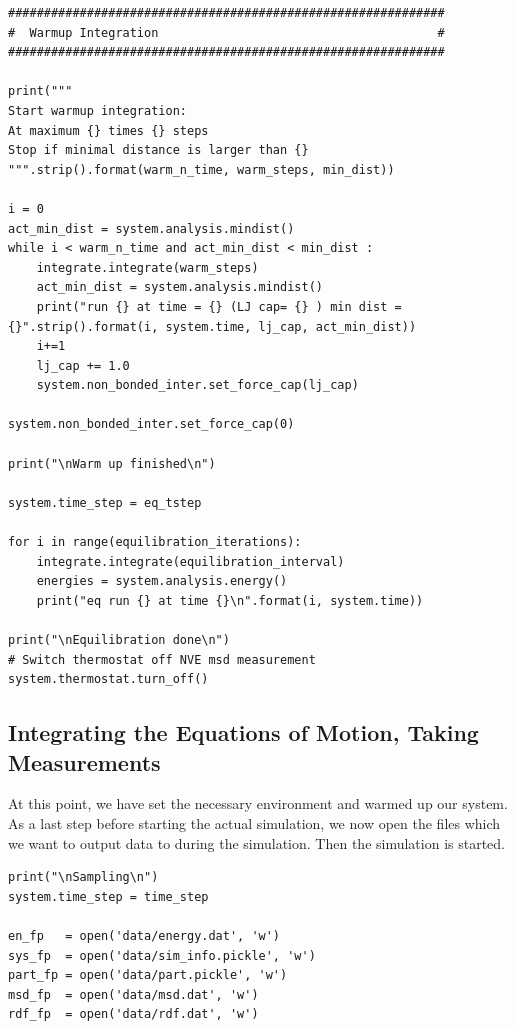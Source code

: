 \documentclass[
paper=a4,                       %
fontsize=11pt,                  %
twoside,                        %
footsepline,                    %
headsepline,                    %
headinclude=false,              %
footinclude=false,              %
pagesize,                       %
]{scrartcl}
\begin{document}
{{\small\vspace{0,2cm}
\begin{lstlisting}
#############################################################
#  Warmup Integration                                       #
#############################################################

print("""
Start warmup integration:
At maximum {} times {} steps
Stop if minimal distance is larger than {}
""".strip().format(warm_n_time, warm_steps, min_dist))

i = 0
act_min_dist = system.analysis.mindist()
while i < warm_n_time and act_min_dist < min_dist :
    integrate.integrate(warm_steps)
    act_min_dist = system.analysis.mindist()
    print("run {} at time = {} (LJ cap= {} ) min dist = {}".strip().format(i, system.time, lj_cap, act_min_dist))
    i+=1
    lj_cap += 1.0
    system.non_bonded_inter.set_force_cap(lj_cap)

system.non_bonded_inter.set_force_cap(0)

print("\nWarm up finished\n")

system.time_step = eq_tstep 

for i in range(equilibration_iterations):
    integrate.integrate(equilibration_interval)
    energies = system.analysis.energy()
    print("eq run {} at time {}\n".format(i, system.time))

print("\nEquilibration done\n")
# Switch thermostat off NVE msd measurement
system.thermostat.turn_off()

\end{lstlisting}}\vspace{0,2cm}

\subsection{Integrating the Equations of Motion, Taking Measurements}
\noindent At this point, we have set the necessary environment and warmed up our system. As a last
step before starting the actual simulation, we now open the files which we want to output data to
during the simulation. Then the simulation is started.

\begin{lstlisting}
print("\nSampling\n")
system.time_step = time_step

en_fp   = open('data/energy.dat', 'w')
sys_fp  = open('data/sim_info.pickle', 'w')
part_fp = open('data/part.pickle', 'w')
msd_fp  = open('data/msd.dat', 'w')
rdf_fp  = open('data/rdf.dat', 'w')


\end{lstlisting}}
\end{document}
